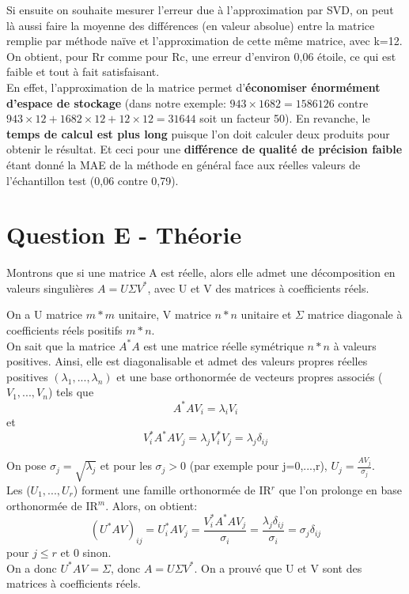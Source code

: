 \documentclass[12pt,a4paper]{article}
\begin{document}
Si ensuite on souhaite mesurer l'erreur due à l'approximation par SVD, on peut là aussi faire la moyenne des différences (en valeur absolue) entre la matrice remplie par méthode naïve et l'approximation de cette même matrice, avec k=12.\\
On obtient, pour Rr comme pour Rc, une erreur d'environ 0,06 étoile, ce qui est faible et tout à fait satisfaisant.\\

En effet, l'approximation de la matrice permet d'\textbf{économiser énormément d'espace de stockage} (dans notre exemple: $943\times1682=1586126$ contre $943\times12+1682\times12+12\times12=31644$ soit un facteur 50). En revanche, le \textbf{temps de calcul est plus long} puisque l'on doit calculer deux produits pour obtenir le résultat. Et ceci pour une \textbf{différence de qualité de précision faible} étant donné la MAE de la méthode en général face aux réelles valeurs de l'échantillon test (0,06 contre 0,79).

\newpage
\section{Question E - Théorie}
Montrons que si une matrice A est réelle, alors elle admet une décomposition en valeurs singulières $A=U \Sigma V^{*}$, avec U et V des matrices à coefficients réels.

On a U matrice $m*m$ unitaire, V matrice $n*n$ unitaire et $\Sigma$ matrice diagonale à coefficients réels positifs $m*n$.\\

On sait que la matrice $A^*A$ est une matrice réelle symétrique $n*n$ à valeurs positives. Ainsi, elle est diagonalisable et admet des valeurs propres réelles positives $(\lambda_1,...,\lambda_n)$ et une base orthonormée de vecteurs propres associés ($V_1,...,V_n$) tels que $$A^*AV_i=\lambda_i V_i$$
et $$ V_i^* A^*AV_j=\lambda_j V_i^* V_j = \lambda_j \delta_{ij}$$

On pose $\sigma_j=\sqrt{\lambda_j}$ et pour les $\sigma_j>0$ (par exemple pour j=0,...,r), $U_j=\frac{AV_j}{\sigma_j}$.\\
Les ($U_1,...,U_r$) forment une famille orthonormée de I\!R$^r$ que l'on prolonge en base orthonormée de I\!R$^m$. Alors, on obtient:
$$(U^*AV)_{ij} = U_i^*AV_j = \frac{V_i^*A^*AV_j}{\sigma_i} = \frac{\lambda_j \delta_{ij}}{\sigma_i} = \sigma_j \delta_{ij} $$
pour $j\leq r $ et 0 sinon.\\

On a donc $U^* A V = \Sigma$, donc $A=U \Sigma V^{*}$. On a prouvé que U et V sont des matrices à coefficients réels.\\
\end{document}
